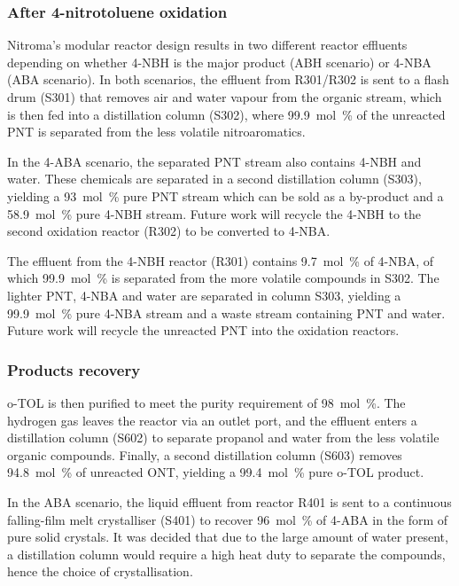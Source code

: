 



\subsubsection{After 4-nitrotoluene oxidation}



Nitroma's modular reactor design results in two different reactor effluents depending on whether 4-NBH is the major product (ABH scenario) or 4-NBA (ABA scenario). In both scenarios, the effluent from R301/R302 is sent to a flash drum (S301) that removes air and water vapour from the organic stream, which is then fed into a distillation column (S302), where \SI{99.9}{mol\percent} of the unreacted PNT is separated from the less volatile nitroaromatics. 

In the 4-ABA scenario, the separated PNT stream also contains 4-NBH and water. These chemicals are separated in a second distillation column (S303), yielding a \SI{93}{mol\percent} pure PNT stream which can be sold as a by-product and a \SI{58.9}{mol\percent} pure 4-NBH stream. Future work will recycle the 4-NBH to the second oxidation reactor (R302) to be converted to 4-NBA.

The effluent from the 4-NBH reactor (R301) contains \SI{9.7}{mol\percent} of 4-NBA, of which \SI{99.9}{mol\percent} is separated from the more volatile compounds in S302. The lighter PNT, 4-NBA and water are separated in column S303, yielding a \SI{99.9}{mol\percent} pure 4-NBA stream and a waste stream containing PNT and water. Future work will recycle the unreacted PNT into the oxidation reactors.



\subsubsection{Products recovery}

o-TOL is then purified to meet the purity requirement of \SI{98}{mol\percent}.
The hydrogen gas leaves the reactor via an outlet port, and the effluent enters a distillation column (S602) to separate propanol and water from the less volatile organic compounds.
Finally, a second distillation column (S603) removes \SI{94.8}{mol\percent} of unreacted ONT, yielding a \SI{99.4}{mol\percent} pure o-TOL product.

In the ABA scenario, the liquid effluent from reactor R401 is sent to a continuous falling-film melt crystalliser (S401) to recover \SI{96}{mol\percent} of 4-ABA in the form of pure solid crystals. It was decided that due to the large amount of water present, a distillation column would require a high heat duty to separate the compounds, hence the choice of crystallisation. 

